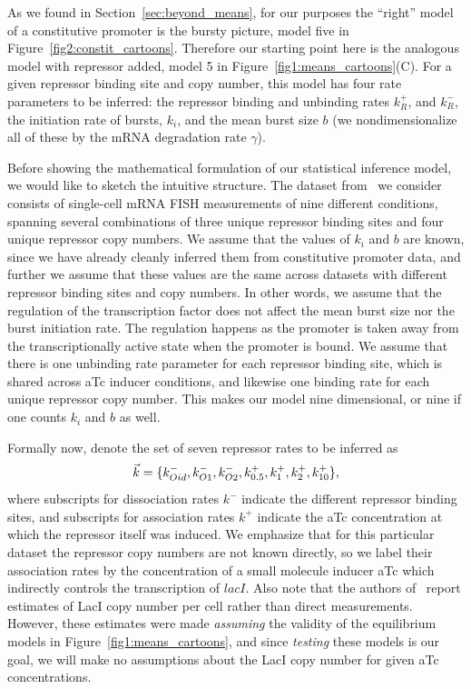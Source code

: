 As we found in Section~\ref{sec:beyond_means}, for our purposes the ``right''
model of a constitutive promoter is the bursty picture, model five in
Figure~\ref{fig2:constit_cartoons}. Therefore our starting point here is the
analogous model with repressor added, model 5 in
Figure~\ref{fig1:means_cartoons}(C). For a given repressor binding site and copy
number, this model has four rate parameters to be inferred: the repressor
binding and unbinding rates $k_R^+$, and $k_R^-$, the initiation rate of bursts,
$k_i$, and the mean burst size $b$ (we nondimensionalize all of these by the
mRNA degradation rate $\gamma$).

Before showing the mathematical formulation of our statistical inference model,
we would like to sketch the intuitive structure. The dataset
from~\cite{Jones2014} we consider consists of single-cell mRNA FISH measurements
of nine different conditions, spanning several combinations of three unique
repressor binding sites and four unique repressor copy numbers. We assume that
the values of $k_i$ and $b$ are known, since we have already cleanly inferred
them from constitutive promoter data, and further we assume that these values
are the same across datasets with different repressor binding sites and copy
numbers. In other words, we assume that the regulation of the transcription
factor does not affect the mean burst size nor the burst initiation rate. The
regulation happens as the promoter is taken away from the transcriptionally
active state when the promoter is bound. We assume that there is one unbinding
rate parameter for each repressor binding site, which is shared across aTc
inducer conditions, and likewise one binding rate for each unique repressor copy
number. This makes our model nine dimensional, or nine if one counts $k_i$ and
$b$ as well.

Formally now, denote the set of seven repressor rates to be inferred as
\begin{equation}
\vec{k} =\{k_{Oid}^-, k_{O1}^-, k_{O2}^-,
k_{0.5}^+, k_{1}^+, k_{2}^+, k_{10}^+\},
\end{equation}
where subscripts for dissociation rates $k^-$  indicate the different repressor
binding sites, and subscripts for association rates $k^+$ indicate the aTc
concentration at which the repressor itself was induced. We emphasize that for
this particular dataset the repressor copy numbers are not known directly, so we
label their association rates by the concentration of a small molecule inducer
aTc which indirectly controls the transcription of $\textit{lacI}$. Also note
that the authors of~\cite{Jones2014} report estimates of LacI copy number per
cell rather than direct measurements. However, these estimates were made
\textit{assuming} the validity of the equilibrium models in
Figure~\ref{fig1:means_cartoons}, and since \textit{testing} these models is our
goal, we will make no assumptions about the LacI copy number for given aTc
concentrations.

